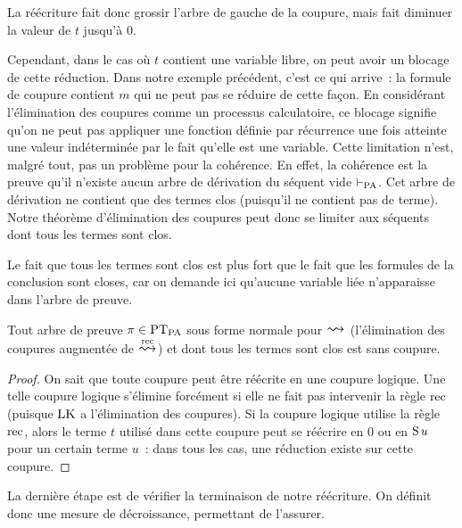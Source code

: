 La réécriture fait donc grossir l'arbre de gauche de la coupure, mais fait
diminuer la valeur de $t$ jusqu'à $0$.

Cependant, dans le cas où $t$ contient une variable libre, on peut avoir un
blocage de cette réduction. Dans notre exemple précédent, c'est ce qui arrive~:
la formule de coupure contient $m$ qui ne peut pas se réduire de cette façon.
En considérant l'élimination des coupures comme un processus calculatoire, ce
blocage signifie qu'on ne peut pas appliquer une fonction définie par récurrence
une fois atteinte une valeur indéterminée par le fait qu'elle est une variable.
Cette limitation n'est, malgré tout, pas un problème pour la cohérence. En
effet, la cohérence est la preuve qu'il n'existe aucun arbre de dérivation du
séquent vide $\vdash_{\operatorname{PA}}$. Cet arbre de dérivation ne contient que des termes clos
(puisqu'il ne contient pas de terme). Notre théorème d'élimination des coupures
peut donc se limiter aux séquents dont tous les termes sont clos.

\begin{remark}
  Le fait que tous les termes sont clos est plus fort que le fait que les
  formules de la conclusion sont closes, car on demande ici qu'aucune variable
  liée n'apparaisse dans l'arbre de preuve.
\end{remark}

\begin{lemma}\label{lem.coh.PA}
  Tout arbre de preuve $\pi \in \operatorname{PT}_{\operatorname{PA}}$ sous forme normale pour
  $\reecr{}$ (l'élimination des coupures augmentée de $\reecr{\Rrec}$) et
  dont tous les termes sont clos est sans coupure.
\end{lemma}

\begin{proof}
  On sait que toute coupure peut être réécrite en une coupure logique. Une
  telle coupure logique s'élimine forcément si elle ne fait pas intervenir
  la règle $\operatorname{rec}$ (puisque $\operatorname{LK}$ a l'élimination des coupures). Si la coupure
  logique utilise la règle $\operatorname{rec}$, alors le terme $t$ utilisé dans cette
  coupure peut se réécrire en $0$ ou en $\operatorname{S} u$ pour un certain terme $u$~: dans
  tous les cas, une réduction existe sur cette coupure.
\end{proof}

La dernière étape est de vérifier la terminaison de notre réécriture. On définit
donc une mesure de décroissance, permettant de l'assurer.

